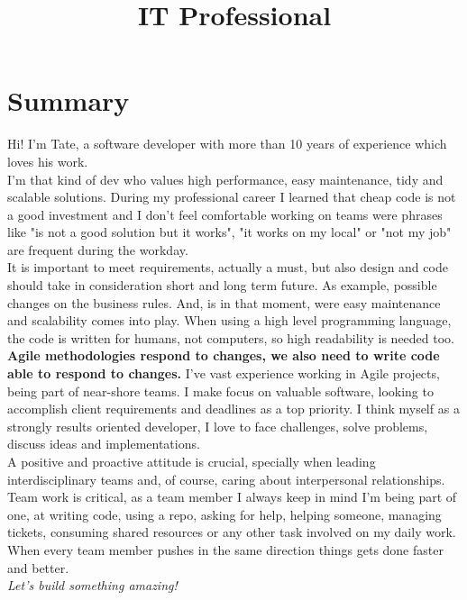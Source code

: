 \documentclass[11pt,a4paper,sans]{moderncv}        %
\title{IT Professional}                               %
\begin{document}
\makecvtitle

\section{Summary}

Hi! I'm Tate, a software developer with more than 10 years of experience which loves his work.\\
I'm that kind of dev who values high performance, easy maintenance, tidy and scalable solutions.
During my professional career I learned that cheap code is not a good investment and I don't feel comfortable working on teams were phrases like "is not a
good solution but it works", "it works on my local" or "not my job" are frequent during the workday.\\
It is important to meet requirements, actually a must, but also design and code should take in consideration short and long term future.
As example, possible changes on the business rules. And, is in that moment, were easy maintenance and scalability comes into play.
When using a high level programming language, the code is written for humans, not computers, so high readability is needed too.
\textbf{Agile methodologies respond to changes, we also need to write code able to respond to changes.}
I've vast experience working in Agile projects, being part of near-shore teams.
I make focus on valuable software, looking to accomplish client requirements and deadlines as a top priority.
I think myself as a strongly results oriented developer, I love to face challenges, solve problems, discuss ideas and implementations.\\
A positive and proactive attitude is crucial, specially when leading interdisciplinary teams and, of course,
caring about interpersonal relationships.\\
Team work is critical, as a team member I always keep in mind I'm being part of one, at writing code, using a repo,
asking for help, helping someone, managing tickets, consuming shared resources or any other task involved on my daily work.
When every team member pushes in the same direction things gets done faster and better.\\
\textit{Let's build something amazing!}\\
\end{document}

